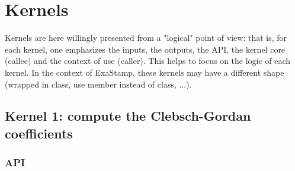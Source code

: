 \documentclass[12pt]{article}
\begin{document}
  \section{Kernels}

    Kernels are here willingly presented from a "logical" point of view: that is, for each kernel, one emphasizes the inputs, the outputs,
    the API, the kernel core (callee) and the context of use (caller). This helps to focus on the logic of each kernel. In the context
    of ExaStamp, these kernels may have a different shape (wrapped in class, use member instead of class, ...).

    \subsection{Kernel 1: compute the Clebsch-Gordan coefficients}


      \subsubsection{API}
\end{document}
